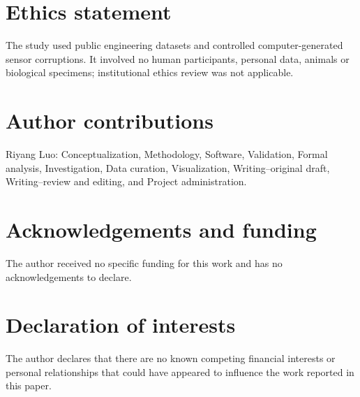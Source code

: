 \documentclass[11pt]{article}
\begin{document}
\section*{Ethics statement}

The study used public engineering datasets and controlled computer-generated sensor corruptions. It involved no human participants, personal data, animals or biological specimens; institutional ethics review was not applicable.

\section*{Author contributions}

Riyang Luo: Conceptualization, Methodology, Software, Validation, Formal analysis, Investigation, Data curation, Visualization, Writing--original draft, Writing--review and editing, and Project administration.

\section*{Acknowledgements and funding}

The author received no specific funding for this work and has no acknowledgements to declare.

\section*{Declaration of interests}

The author declares that there are no known competing financial interests or personal relationships that could have appeared to influence the work reported in this paper.



\end{document}
